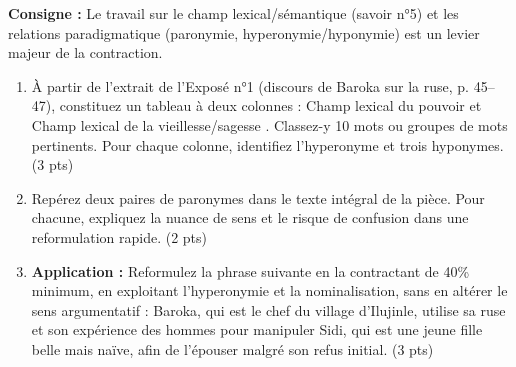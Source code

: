\documentclass[11pt]{article}
\begin{document}
\begin{exercice}
\textbf{Consigne :} Le travail sur le champ lexical/sémantique (savoir n°5) et les relations paradigmatique (paronymie, hyperonymie/hyponymie) est un levier majeur de la contraction.
\begin{enumerate}
    \item À partir de l'extrait de l'Exposé n°1 (discours de Baroka sur la ruse, p. 45--47), constituez un tableau à deux colonnes : \og Champ lexical du pouvoir \fg{} et \og Champ lexical de la vieillesse/sagesse \fg{}. Classez-y 10 mots ou groupes de mots pertinents. Pour chaque colonne, identifiez l'hyperonyme et trois hyponymes. (3 pts)
    \item Repérez deux paires de paronymes dans le texte intégral de la pièce. Pour chacune, expliquez la nuance de sens et le risque de confusion dans une reformulation rapide. (2 pts)
    \item \textbf{Application :} Reformulez la phrase suivante en la contractant de 40\% minimum, en exploitant l'hyperonymie et la nominalisation, sans en altérer le sens argumentatif : \og Baroka, qui est le chef du village d'Ilujinle, utilise sa ruse et son expérience des hommes pour manipuler Sidi, qui est une jeune fille belle mais naïve, afin de l'épouser malgré son refus initial. \fg{} (3 pts)
\end{enumerate}
\end{exercice}
\end{document}
